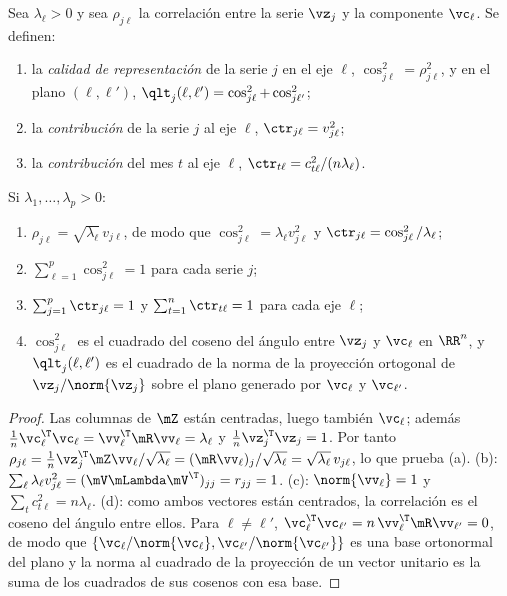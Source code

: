\begin{definicion}\label{def:cos2}
Sea $\lambda_\ell>0$ y sea $\rho_{j\ell}$ la correlación entre la serie $\vz_j$ y la componente
$\vc_\ell$. Se definen:
\begin{enumerate}[label=(\alph*)]
  \item la \emph{calidad de representación} de la serie $j$ en el eje $\ell$,
    $\cos^2_{j\ell}=\rho_{j\ell}^2$, y en el plano $(\ell,\ell')$,
    $\qlt_j(\ell,\ell')=\cos^2_{j\ell}+\cos^2_{j\ell'}$;
  \item la \emph{contribución} de la serie $j$ al eje $\ell$, $\ctr_{j\ell}=v_{j\ell}^2$;
  \item la \emph{contribución} del mes $t$ al eje $\ell$, $\ctr_{t\ell}=c_{t\ell}^2/(n\lambda_\ell)$.
\end{enumerate}
\end{definicion}

\begin{proposicion}\label{prop:cos2}
Si $\lambda_1,\dots,\lambda_p>0$:
\begin{enumerate}[label=(\alph*)]
  \item $\rho_{j\ell}=\sqrt{\lambda_\ell}\,v_{j\ell}$, de modo que $\cos^2_{j\ell}=\lambda_\ell
    v_{j\ell}^2$ y $\ctr_{j\ell}=\cos^2_{j\ell}/\lambda_\ell$;
  \item $\sum_{\ell=1}^{p}\cos^2_{j\ell}=1$ para cada serie $j$;
  \item $\sum_{j=1}^{p}\ctr_{j\ell}=1$ y $\sum_{t=1}^{n}\ctr_{t\ell}=1$ para cada eje $\ell$;
  \item $\cos^2_{j\ell}$ es el cuadrado del coseno del ángulo entre $\vz_j$ y $\vc_\ell$ en
    $\RR^n$, y $\qlt_j(\ell,\ell')$ es el cuadrado de la norma de la proyección ortogonal de
    $\vz_j/\norm{\vz_j}$ sobre el plano generado por $\vc_\ell$ y $\vc_{\ell'}$.
\end{enumerate}
\end{proposicion}

\begin{proof}
Las columnas de $\mZ$ están centradas, luego también $\vc_\ell$; además
$\frac1n\vc_\ell^{\T}\vc_\ell=\vv_\ell^{\T}\mR\vv_\ell=\lambda_\ell$ y
$\frac1n\vz_j^{\T}\vz_j=1$. Por tanto
$\rho_{j\ell}=\frac1n\vz_j^{\T}\mZ\vv_\ell/\sqrt{\lambda_\ell}=(\mR\vv_\ell)_j/\sqrt{\lambda_\ell}
=\sqrt{\lambda_\ell}\,v_{j\ell}$, lo que prueba (a). (b): $\sum_\ell\lambda_\ell v_{j\ell}^2=
(\mV\mLambda\mV^{\T})_{jj}=r_{jj}=1$. (c): $\norm{\vv_\ell}=1$ y
$\sum_t c_{t\ell}^2=n\lambda_\ell$. (d): como ambos vectores están centrados, la correlación es
el coseno del ángulo entre ellos. Para $\ell\ne\ell'$,
$\vc_\ell^{\T}\vc_{\ell'}=n\,\vv_\ell^{\T}\mR\vv_{\ell'}=0$, de modo que
$\{\vc_\ell/\norm{\vc_\ell},\vc_{\ell'}/\norm{\vc_{\ell'}}\}$ es una base ortonormal del plano y la
norma al cuadrado de la proyección de un vector unitario es la suma de los cuadrados de sus
cosenos con esa base.
\end{proof}

